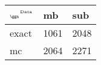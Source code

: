 \begin{tabular}{lll}
    \toprule
    $_{\text{\tiny{\ggn}}}$$^{\text{\tiny{Data}}}$ & mb & sub \\
    \midrule
    exact & 1061
              & 2048 \\
    mc   & 2064
              & 2271 \\
    \bottomrule
\end{tabular}